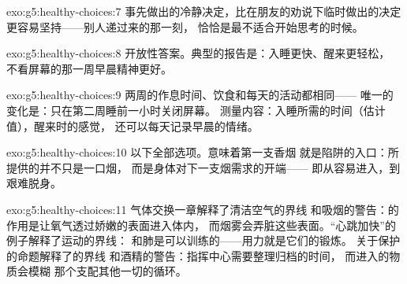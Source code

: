 \begin{solution}{exo:g5:healthy-choices:7}
事先做出的冷静决定，比在朋友的劝说下临时做出的决定
更容易坚持——别人递过来的那一刻，
恰恰是最不适合开始思考的时候。
\end{solution}

\begin{solution}{exo:g5:healthy-choices:8}
开放性答案。典型的报告是：入睡更快、醒来更轻松，
不看屏幕的那一周早晨精神更好。
\end{solution}

\begin{solution}{exo:g5:healthy-choices:9}
两周的作息时间、饮食和每天的活动都相同——
唯一的变化是：只在第二周睡前一小时关闭屏幕。
测量内容：入睡所需的时间（估计值），醒来时的感觉，
还可以每天记录早晨的情绪。
\end{solution}

\begin{solution}{exo:g5:healthy-choices:10}
以下全部选项。意味着第一支香烟
就是陷阱的入口：所提供的并不只是一口烟，
而是身体对下一支烟需求的开端——
即从容易进入，到艰难脱身。
\end{solution}

\begin{solution}{exo:g5:healthy-choices:11}
气体交换一章解释了清洁空气的界线
和吸烟的警告：的作用是让氧气透过娇嫩的表面进入体内，
而烟雾会弄脏这些表面。“心跳加快”的例子解释了运动的界线：
和肺是可以训练的——用力就是它们的锻炼。
关于保护的命题解释了的界线
和酒精的警告：指挥中心需要整理归档的时间，
而进入的物质会模糊
那个支配其他一切的循环。
\end{solution}
